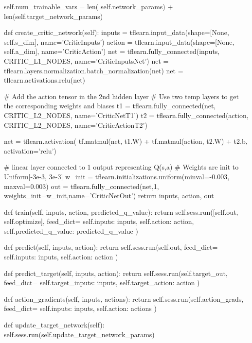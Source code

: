 \begin{python}[caption={Critic Network Class},label={list:critic_net}]
        self.num_trainable_vars = len(
            self.network_params) + len(self.target_network_params)


    def create_critic_network(self):
        inputs = tflearn.input_data(shape=[None, self.s_dim], name='CriticInputs')
        action = tflearn.input_data(shape=[None, self.a_dim], name='CriticAction')
        net = tflearn.fully_connected(inputs, CRITIC_L1_NODES, name='CriticInputsNet')
        net = tflearn.layers.normalization.batch_normalization(net)
        net = tflearn.activations.relu(net)

        # Add the action tensor in the 2nd hidden layer
        # Use two temp layers to get the corresponding weights and biases
        t1 = tflearn.fully_connected(net, CRITIC_L2_NODES, name='CriticNetT1')
        t2 = tflearn.fully_connected(action, CRITIC_L2_NODES, name='CriticActionT2')

        net = tflearn.activation(
            tf.matmul(net, t1.W) + tf.matmul(action, t2.W) + t2.b, activation='relu')

        # linear layer connected to 1 output representing Q(s,a)
        # Weights are init to Uniform[-3e-3, 3e-3]
        w_init = tflearn.initializations.uniform(minval=-0.003, maxval=0.003)
        out = tflearn.fully_connected(net,1, weights_init=w_init,name='CriticNetOut')
        return inputs, action, out

    def train(self, inputs, action, predicted_q_value):
        return self.sess.run([self.out, self.optimize], feed_dict={
            self.inputs: inputs,
            self.action: action,
            self.predicted_q_value: predicted_q_value
        })

    def predict(self, inputs, action):
        return self.sess.run(self.out, feed_dict={
            self.inputs: inputs,
            self.action: action
        })

    def predict_target(self, inputs, action):
        return self.sess.run(self.target_out, feed_dict={
            self.target_inputs: inputs,
            self.target_action: action
        })

    def action_gradients(self, inputs, actions):
        return self.sess.run(self.action_grads, feed_dict={
            self.inputs: inputs,
            self.action: actions
        })

    def update_target_network(self):
        self.sess.run(self.update_target_network_params)
\end{python}

